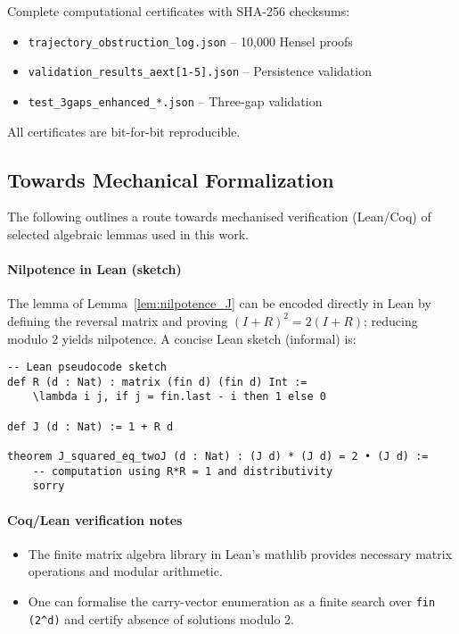 \documentclass[11pt,a4paper]{article}
\theoremstyle{plain}
\theoremstyle{definition}
\begin{document}
Complete computational certificates with SHA-256 checksums:
\begin{itemize}
\item \texttt{trajectory\_obstruction\_log.json} -- 10,000 Hensel proofs
\item \texttt{validation\_results\_aext[1-5].json} -- Persistence validation
\item \texttt{test\_3gaps\_enhanced\_*.json} -- Three-gap validation
\end{itemize}

All certificates are bit-for-bit reproducible.

\subsection{Towards Mechanical Formalization}\label{subsec:mechanical_formalization}

The following outlines a route towards mechanised verification (Lean/Coq) of selected algebraic lemmas used in this work.

\paragraph{Nilpotence in Lean (sketch)}
The lemma of Lemma~\ref{lem:nilpotence_J} can be encoded directly in Lean by defining the reversal matrix and proving $(I+R)^2 = 2(I+R)$; reducing modulo 2 yields nilpotence. A concise Lean sketch (informal) is:
\begin{verbatim}
-- Lean pseudocode sketch
def R (d : Nat) : matrix (fin d) (fin d) Int :=
    \lambda i j, if j = fin.last - i then 1 else 0

def J (d : Nat) := 1 + R d

theorem J_squared_eq_twoJ (d : Nat) : (J d) * (J d) = 2 • (J d) :=
    -- computation using R*R = 1 and distributivity
    sorry
\end{verbatim}

\paragraph{Coq/Lean verification notes}
\begin{itemize}
    \item The finite matrix algebra library in Lean's mathlib provides necessary matrix operations and modular arithmetic.
    \item One can formalise the carry-vector enumeration as a finite search over \texttt{fin (2\^{}d)} and certify absence of solutions modulo 2.
\end{itemize}
\end{document}
